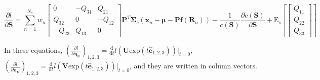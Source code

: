 \documentclass[10pt]{article}
\begin{document}
\begin{equation}
	\frac{\partial l}{\partial\mathbf{S}} = \sum_{n=1}^{N_s}w_n\begin{bmatrix}
		0 & -Q_{31} & Q_{21} \\
		Q_{32} & 0 & -Q_{12} \\
		-Q_{23} & Q_{13} & 0
	\end{bmatrix}\mathbf{P}^T\mathbf{\Sigma}_c\left(\bm{x}_n-\bm{\mu}-\mathbf{P}\bm{f}(\mathbf{R}_n)\right) - \frac{1}{c(\mathbf{S})}\frac{\partial c(\mathbf{S})}{\partial\mathbf{S}} + \mathrm{E}_s\left[\begin{bmatrix}Q_{11}\\Q_{22}\\Q_{33}\end{bmatrix}\right]
\end{equation}

In these equations, $\left(\frac{\partial l}{\partial\bm{\eta}_\mathbf{U}}\right)_{1,2,3} = \frac{\mathrm{d}}{\mathrm{d}t}l(\mathbf{U}\mathrm{exp}(t\hat{\bm{e}}_{1,2,3}))\lvert_{t=0}$, $\left(\frac{\partial l}{\partial\bm{\eta}_\mathbf{V}}\right)_{1,2,3} = \frac{\mathrm{d}}{\mathrm{d}t}l(\mathbf{V}\mathrm{exp}(t\hat{\bm{e}}_{1,2,3}))\lvert_{t=0}$, and they are written in column vectors.
\end{document}
